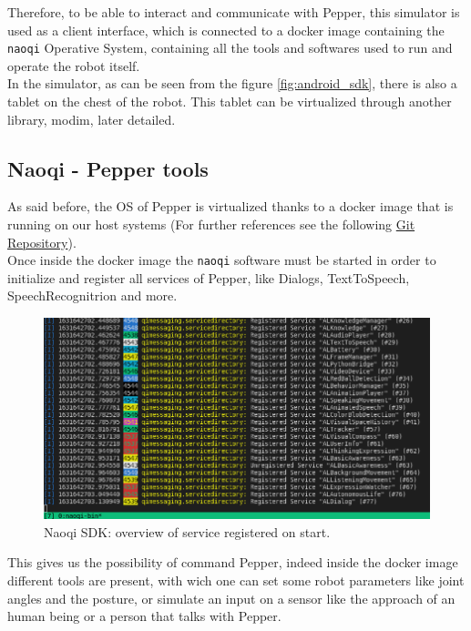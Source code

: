\documentclass[12pt, letterpaper, twoside]{article}
\begin{document}
Therefore, to be able to interact and communicate with Pepper, this simulator is used as a client interface, which is connected to a docker image containing the \verb|naoqi| Operative System, containing all the tools and softwares used to run and operate the robot itself.\\
In the simulator, as can be seen from the figure \ref{fig:android_sdk}, there is also a tablet on the chest of the robot. This tablet can be virtualized through another library, modim, later detailed.

\newpage
\subsection{Naoqi - Pepper tools}
As said before, the OS of Pepper is virtualized thanks to a docker image that is running on our host systems (For further references see the following \href{https://bitbucket.org/iocchi/hri_software/src/master/}{Git Repository}).\\
Once inside the docker image the \verb|naoqi| software must be started in order to initialize and register all services of Pepper, like Dialogs, TextToSpeech, SpeechRecognitrion and more.\\

\begin{figure}[htbp]
	\centerline{\includegraphics[scale=.6]{img/naoqi.png}}
	\caption{Naoqi SDK: overview of service registered on start.}
	\label{fig}
\end{figure}

This gives us the possibility of command Pepper, indeed inside the docker image different tools are present, with wich one can set some robot parameters like joint angles and the posture, or simulate an input on a sensor like the approach of an human being or a person that talks with Pepper.\\
\end{document}
